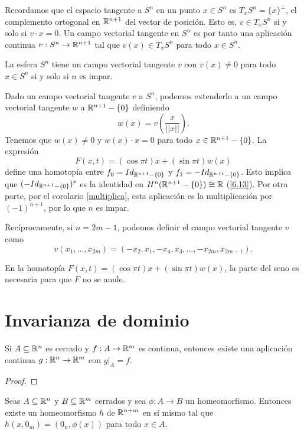 \documentclass[CV.tex]{subfiles}
\begin{document}
Recordamos que el espacio tangente a $S^n$ en un punto $x\in S^n$ es $T_xS^n=\{x\}^{\perp}$, el complemento ortogonal en $\mathbb{R}^{n+1}$ del vector de posición. Esto es, $v\in T_xS^n$ si y solo si $v\cdot x=0$. Un campo vectorial tangente en $S^n$ es por tanto una aplicación continua $v:S^n\to\mathbb{R}^{n+1}$ tal que $v(x)\in T_xS^n$ para todo $x\in S^n$. 

\begin{teorema}
La esfera $S^n$ tiene un campo vectorial tangente $v$ con $v(x)\neq 0$ para todo $x\in S^n$ si y solo si $n$ es impar.
\end{teorema}
\begin{dem}
Dado un campo vectorial tangente $v$ a $S^n$, podemos extenderlo a un campo vectorial tangente $w$ a $\mathbb{R}^{n+1}-\{0\}$ definiendo
\[
w(x)=v\left(\frac{x}{||x||}\right).
\] 
Tenemos que $w(x)\neq 0$ y $w(x)\cdot x=0$ para todo $x\in\mathbb{R}^{n+1}-\{0\}$. La expresión
\[
F(x,t)=(\cos\pi t)x+(\sin\pi t)w(x)
\]
define una homotopía entre $f_0=Id_{\mathbb{R}^{n+1}-\{0\}}$ y $f_1=-Id_{\mathbb{R}^{n+1}-\{0\}}$. Esto implica que $(-Id_{\mathbb{R}^{n+1}-\{0\}})^*$ es la identidad en $H^n(\mathbb{R}^{n+1}-\{0\})\cong\mathbb{R}$ (\ref{6.13}). Por otra parte, por el corolario \ref{multiplica}, esta aplicación es la multiplicación por $(-1)^{n+1}$, por lo que $n$ es impar. 

Recíprocamente, si $n=2m-1$, podemos definir el campo vectorial tangente $v$ como
\[
v(x_1,\dots, x_{2m})=(-x_2, x_1,-x_4,x_3,\dots, -x_{2m},x_{2m-1}).
\]
\QED
\end{dem}
\begin{nota}
En la homotopía $F(x,t)=(\cos\pi t)x+(\sin\pi t)w(x)$, la parte del seno es necesaria para que $F$ no se anule.
\end{nota}


\section{Invarianza de dominio}


\begin{lemma} Si $A\subseteq \mathbb{R}^n$ es cerrado y $f:A\to\mathbb{R}^m$ es continua, entonces existe una aplicación continua $g:\mathbb{R}^n\to\mathbb{R}^m$ con $g|_A=f$.
\end{lemma}
\begin{proof}

\end{proof}

\begin{prop}
Seas $A\subseteq\mathbb{R}^n$ y $B\subseteq\mathbb{R}^m$ cerrados y sea $\phi:A\to B$ un homeomorfismo. Entonces existe un homeomorfismo $h$ de $\mathbb{R}^{n+m}$ en sí mismo tal que $h(x,0_m)=(0_n,\phi(x))$ para todo $x\in A$. 
\end{prop}
\begin{dem}
\QED
\end{dem}
\end{document}
